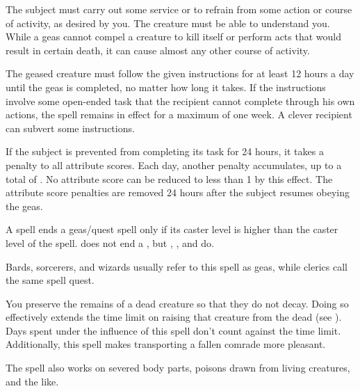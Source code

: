 \begin{spelleffect}
The subject must carry out some service or to refrain from some action or course of activity, as desired by you. The creature must be able to understand you. While a geas cannot compel a creature to kill itself or perform acts that would result in certain death, it can cause almost any other course of activity.

The geased creature must follow the given instructions for at least 12 hours a day until the geas is completed, no matter how long it takes. If the instructions involve some open-ended task that the recipient cannot complete through his own actions, the spell remains in effect for a maximum of one week. A clever recipient can subvert some instructions.
\par If the subject is prevented from completing its task for 24 hours, it takes a  penalty to all attribute scores. Each day, another  penalty accumulates, up to a total of . No attribute score can be reduced to less than 1 by this effect. The attribute score penalties are removed 24 hours after the subject resumes obeying the geas.
\end{spelleffect}
\begin{spellnotes}
\par A  spell ends a geas/quest spell only if its caster level is higher than the caster level of the  spell.  does not end a , but , , and  do.
\par Bards, sorcerers, and wizards usually refer to this spell as geas, while clerics call the same spell quest.
\end{spellnotes}

\begin{spelleffect}
You preserve the remains of a dead creature so that they do not decay. Doing so effectively extends the time limit on raising that creature from the dead (see ). Days spent under the influence of this spell don't count against the time limit. Additionally, this spell makes transporting a fallen comrade more pleasant.
\par The spell also works on severed body parts, poisons drawn from living creatures, and the like.
\end{spelleffect}

